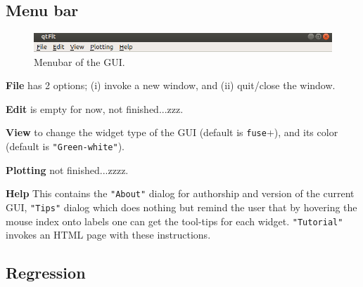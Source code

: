 \documentclass[10pt,letterpaper,oneside]{article}
\begin{document}
\subsection{Menu bar}
\begin{figure}[!htb]
\includegraphics[width=\textwidth]{menubar.png}
 \caption{Menubar of the GUI.}
 \label{fig-mag}
 \end{figure}
{\bf File} has 2 options; (i) invoke a new window, and (ii) quit/close the window.

{\bf Edit} is empty for now, not finished...zzz.

{\bf View} to change the widget type of the GUI (default is \verb"fuse"+), 
and its color (default is \verb+"Green-white"+).

{\bf Plotting} not finished...zzzz.%

{\bf Help} This contains the \verb+"About"+ dialog for authorship and version of the current GUI,  \verb+"Tips"+ dialog which does nothing but remind the user that by hovering the mouse index onto labels one can get the tool-tips for each widget. \verb+"Tutorial"+ invokes an HTML page with these instructions.
	


\subsection{Regression}
\end{document}
